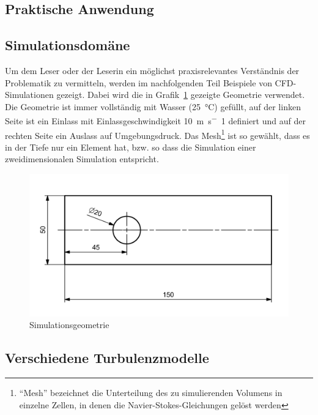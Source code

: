 \begin{refsection}



\section{Praktische Anwendung}

\subsection{Simulationsdomäne}
\label{subsubsec:domain-desc}

Um dem Leser oder der Leserin ein möglichst praxisrelevantes Verständnis der Problematik zu vermitteln, werden
im nachfolgenden Teil Beispiele von CFD-Simulationen gezeigt.
Dabei wird die in Grafik~\ref{fig:SimDomain} gezeigte Geometrie verwendet.
Die Geometrie ist immer vollständig mit Wasser (\SI{25}{\degreeCelsius}) gefüllt,
auf der linken Seite ist ein Einlass mit Einlassgeschwindigkeit \SI{10}{m.s^-1} definiert und
auf der rechten Seite ein Auslass auf Umgebungsdruck.
Das Mesh\footnote{``Mesh'' bezeichnet die Unterteilung des zu simulierenden Volumens in einzelne Zellen,
in denen die Navier-Stokes-Gleichungen gelöst werden} ist so gewählt, dass es in der Tiefe nur ein Element hat,
bzw. so dass die Simulation einer zweidimensionalen Simulation entspricht.

\begin{figure}
    \includegraphics[width=\textwidth]{papers/reynolds/images/domain.png}
    \caption{Simulationsgeometrie}
    \label{fig:SimDomain}
\end{figure}

\subsection{Verschiedene Turbulenzmodelle}


\end{refsection}
